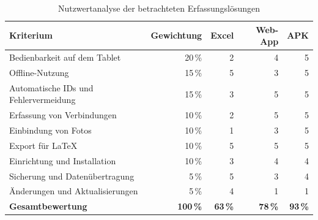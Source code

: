\begin{table}[htbp]
    \centering
    \caption{Nutzwertanalyse der betrachteten Erfassungslösungen}
    \label{tab:nutzwertanalyse-erfassung}
    \begin{tabular}{p{5.3cm}rrrr}
        \hline
        \textbf{Kriterium} &
        \textbf{Gewichtung} &
        \textbf{Excel} &
        \textbf{Web-App} &
        \textbf{APK} \\
        \hline

        Bedienbarkeit auf dem Tablet
        & 20\,\% & 2 & 4 & 5 \\

        Offline-Nutzung
        & 15\,\% & 5 & 3 & 5 \\

        Automatische IDs und Fehlervermeidung
        & 15\,\% & 3 & 5 & 5 \\

        Erfassung von Verbindungen
        & 10\,\% & 2 & 5 & 5 \\

        Einbindung von Fotos
        & 10\,\% & 1 & 3 & 5 \\

        Export für \LaTeX
        & 10\,\% & 5 & 5 & 5 \\

        Einrichtung und Installation
        & 10\,\% & 3 & 4 & 4 \\

        Sicherung und Datenübertragung
        & 5\,\% & 5 & 3 & 4 \\

        Änderungen und Aktualisierungen
        & 5\,\% & 4 & 1 & 1 \\
        \hline

        \textbf{Gesamtbewertung}
        & \textbf{100\,\%}
        & \textbf{63\,\%}
        & \textbf{78\,\%}
        & \textbf{93\,\%} \\

        \hline
    \end{tabular}
\end{table}

